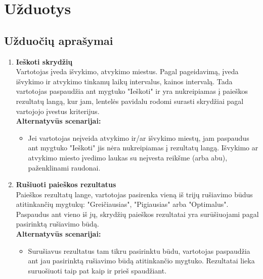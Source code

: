 \documentclass{VUMIFPSkursinis}
\begin{document}
        \section{Užduotys}
            \subsection{Užduočių aprašymai}
            
                \begin{enumerate}[label=\textbf{U\arabic*}.]

                    \item \textbf{Ieškoti skrydžių}\\
                    Vartotojas įveda išvykimo, atvykimo miestus. Pagal pageidavimą, įveda išvykimo ir atvykimo tinkamų laikų intervalus, kainos intervalą. Tada vartotojas paspaudžia ant mygtuko "Ieškoti" ir yra nukreipiamas į paieškos rezultatų langą, kur jam, lentelės pavidalu rodomi surasti skrydžiai pagal vartojojo įvestus kriterijus.
                    \\\textbf{Alternatyvūs scenarijai:}
                    \begin{itemize}
                        \item Jei vartotojas neįveida atvykimo ir/ar išvykimo miestų, jam paspaudus ant mygtuko "Ieškoti" jis nėra nukreipiamas į rezultatų langą. Išvykimo ar atvykimo miesto įvedimo laukas su neįvesta reikšme (arba abu), paženklinami raudonai.
                    \end{itemize}

                    \item \textbf{Rušiuoti paieškos rezultatus}\\
                    Paieškos rezultatų lange, vartotojas pasirenka vieną iš trijų rušiavimo būdus atitinkančių mygtukų: "Greičiausias", "Pigiausias" arba "Optimalus". Paspaudus ant vieno iš jų, skrydžių paieškos rezultatai yra surūšiuojami pagal pasirinktą rušiavimo būdą.
                    \\\textbf{Alternatyvūs scenarijai:}
                    \begin{itemize}
                        \item Surušiavus rezultatus tam tikru pasirinktu būdu, vartotojas paspaudžia ant jau pasirinktą rušiavimo būdą atitinkančio mygtuko. Rezultatai lieka suruošiuoti taip pat kaip ir prieš spaudžiant. 
                    \end{itemize}


\end{enumerate}
\end{document}
